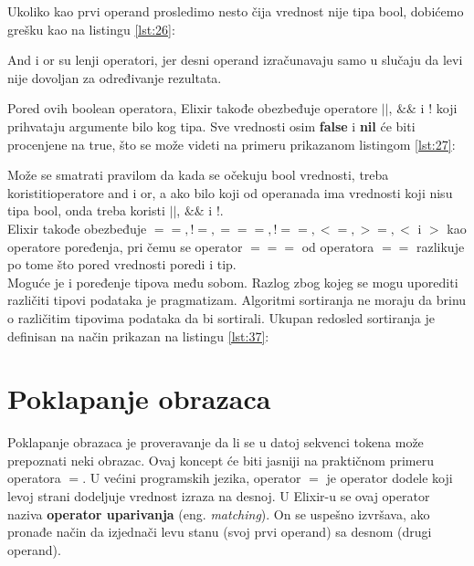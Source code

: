 \documentclass[12pt,oneside]{memoir}
\begin{document}


Ukoliko kao prvi operand prosledimo nesto čija vrednost nije tipa bool, dobićemo grešku kao na listingu \ref{lst:26}:



And i or su lenji operatori, jer desni operand izračunavaju samo u slučaju da levi nije dovoljan za određivanje rezultata.

Pored ovih boolean operatora, Elixir takođe obezbeđuje operatore $||$, $\&\&$ i $!$ koji prihvataju argumente bilo kog tipa. Sve vrednosti osim \textbf{false} i \textbf{nil} će biti procenjene na true, što se može videti na primeru prikazanom listingom \ref{lst:27}:



Može se smatrati pravilom da kada se očekuju bool vrednosti, treba koristitioperatore and i or, a ako bilo koji od operanada ima vrednosti koji nisu tipa bool, onda treba koristi $||$, $\&\&$ i $!$.\\

Elixir takođe obezbeđuje $==,! =, ===,! ==, <=,> =, <$ i $ >$ kao operatore poređenja, pri čemu se operator $===$ od operatora $==$ razlikuje po tome što pored vrednosti poredi i tip.\\

Moguće je i poređenje tipova među sobom. Razlog zbog kojeg se mogu uporediti različiti tipovi podataka je pragmatizam. Algoritmi sortiranja ne moraju da brinu o različitim tipovima podataka da bi sortirali. Ukupan redosled sortiranja je definisan na način prikazan na listingu \ref{lst:37}:



\newpage

\section{Poklapanje obrazaca}

Poklapanje obrazaca je proveravanje da li se u datoj sekvenci tokena može prepoznati neki obrazac. Ovaj koncept će biti jasniji na praktičnom primeru operatora $=$. U većini programskih jezika, operator $=$ je operator dodele koji levoj strani dodeljuje vrednost izraza na desnoj. U Elixir-u se ovaj operator naziva \textbf{operator uparivanja} (eng. \textit{matching}). On se uspešno izvršava, ako pronađe način da izjednači levu stanu (svoj prvi operand) sa desnom (drugi operand).
\end{document}
